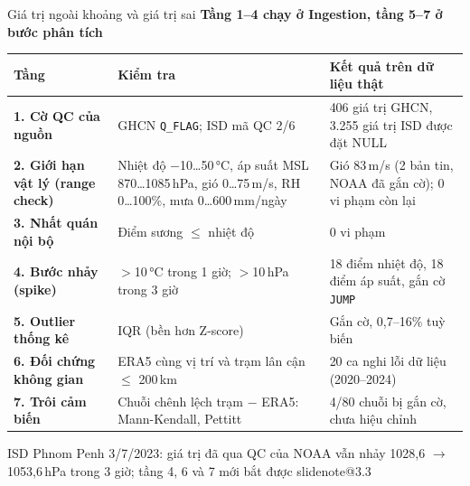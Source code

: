 \documentclass[t,aspectratio=169,12pt]{beamer}
\makeatletter
\newcommand{\slidenote}[1]{\ifcsname slidenote@#1\endcsname\note{\csname slidenote@#1\endcsname}\fi}
\newcommand{\ketluan}[1]{\vskip2mm{\color{hustred}#1}}
\newcommand{\ychinh}[1]{\vskip1mm{\bfseries #1}\par\vskip1mm}
\makeatother
\begin{document}
\begin{frame}{Giá trị ngoài khoảng và giá trị sai}
  \ychinh{Tầng 1--4 chạy ở Ingestion, tầng 5--7 ở bước phân tích}
  \scriptsize
  \renewcommand{\arraystretch}{0.92}
  \begin{tabular}{@{}>{\bfseries}p{2.6cm}p{4.9cm}p{6.1cm}@{}}
    \toprule
    Tầng & Kiểm tra & Kết quả trên dữ liệu thật \\
    \midrule
    1. Cờ QC của nguồn & GHCN \texttt{Q\_FLAG}; ISD mã QC 2/6 & 406 giá trị GHCN, 3.255 giá trị ISD được đặt NULL \\
    2. Giới hạn vật lý (range check) & Nhiệt độ $-$10\ldots50\,°C, áp suất MSL 870\ldots1085\,hPa, gió 0\ldots75\,m/s, RH 0\ldots100\%, mưa 0\ldots600\,mm/ngày & Gió 83\,m/s (2 bản tin, NOAA đã gắn cờ); 0 vi phạm còn lại \\
    3. Nhất quán nội bộ & Điểm sương $\leq$ nhiệt độ & 0 vi phạm \\
    4. Bước nhảy (spike) & $>$10\,°C trong 1 giờ; $>$10\,hPa trong 3 giờ & 18 điểm nhiệt độ, 18 điểm áp suất, gắn cờ \texttt{JUMP} \\
    5. Outlier thống kê & IQR (bền hơn Z-score) & Gắn cờ, 0,7--16\% tuỳ biến \\
    6. Đối chứng không gian & ERA5 cùng vị trí và trạm lân cận $\leq$ 200\,km & 20 ca nghi lỗi dữ liệu (2020--2024) \\
    7. Trôi cảm biến & Chuỗi chênh lệch trạm $-$ ERA5: Mann-Kendall, Pettitt & 4/80 chuỗi bị gắn cờ, chưa hiệu chỉnh \\
    \bottomrule
  \end{tabular}
  \ketluan{\scriptsize ISD Phnom Penh 3/7/2023: giá trị đã qua QC của NOAA vẫn nhảy 1028,6 $\to$ 1053,6\,hPa trong 3 giờ; tầng 4, 6 và 7 mới bắt được}
  \slidenote{3.3}
\end{frame}
\end{document}
